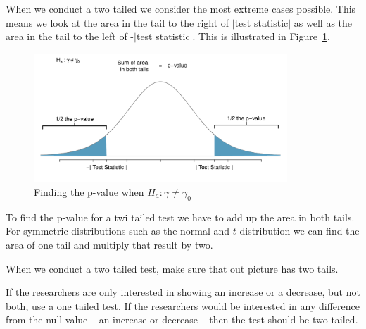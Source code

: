 When we conduct a two tailed we consider the most extreme cases possible.
This means we look at the area in the tail to the right of $|$test statistic$|$
as well as the area in the tail to the left of -$|$test statistic$|$.
This is illustrated in Figure~\ref{figHaNotEqual}.



\begin{figure}[H]
\centering
\includegraphics[width=0.85\textwidth]{05-5/figures/pvalTwoTail/pvalTwoTailversion2.pdf}
\captionsetup{width=0.9\textwidth}
\caption{Finding the p-value when $H_a : \gamma \neq \gamma_0$}
\label{figHaNotEqual}
\end{figure}


To find the p-value for a twi tailed test we have to add up the area in both tails.
For symmetric distributions such as the normal and $t$ distribution we can
find the area of one tail and multiply that result by two.

\begin{tipBox}{
When we conduct a two tailed test, make sure that out picture has two tails.
\vspace{0.5mm} }
\end{tipBox}


\begin{tipBox}{
If the researchers are only interested in showing an increase or a decrease, but not both, use a one tailed test. If the researchers would be interested in any difference from the null value -- an increase or decrease -- then the test should be two tailed.\\
\vspace{0.5mm}}
\end{tipBox}








